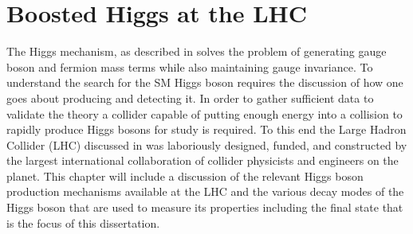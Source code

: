 \chapter{Boosted Higgs at the LHC} \label{chap:higgs}

The Higgs mechanism, as described in  solves the
problem of generating gauge boson and fermion mass terms while also maintaining
gauge invariance.  To understand the search for the SM Higgs boson requires the
discussion of how one goes about producing and detecting it.  In order to
gather sufficient data to validate the theory a collider capable of
putting enough energy into a collision to rapidly produce Higgs bosons for
study is required.  To this end the Large Hadron Collider (LHC) discussed in
 was laboriously designed, funded, and constructed by the
largest international collaboration of collider physicists and engineers on the
planet. This chapter will include a discussion of the relevant Higgs boson
production mechanisms available at the LHC and the various decay modes of the
Higgs boson that are used to measure its properties including the final state
that is the focus of this dissertation.






